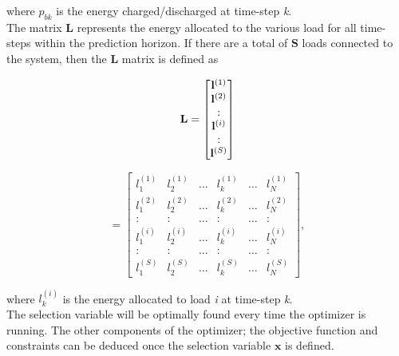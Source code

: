 where $p_{bk}$ is the energy charged/discharged at time-step \textit{k}.\\

The matrix $\mathbf{L}$ represents the energy allocated to the various load for all time-steps within the prediction horizon. If there are a total of $\mathbf{S}$ loads connected to the system, then the $\mathbf{L}$ matrix is defined as

\begin{equation}
    \mathbf{L} = \begin{bmatrix}
                        \mathbf{l}^{(1)} \\
                        \mathbf{l}^{(2)} \\
                        : \\
                        \mathbf{l}^{(i)} \\
                        : \\
                        \mathbf{l}^{(S)}
                    \end{bmatrix}\notag
\end{equation}

\begin{equation}
                = \begin{bmatrix}
                        l_1^{(1)} & l_2^{(1)} & \ldots & l_k^{(1)} & \ldots & l_N^{(1)} \\
                        l_1^{(2)} & l_2^{(2)} & \ldots & l_k^{(2)} & \ldots & l_N^{(2)} \\
                        : & : & \ldots & : & \ldots & : \\
                        l_1^{(i)} & l_2^{(i)} & \ldots & l_k^{(i)} & \ldots & l_N^{(i)} \\
                        : & : & \ldots & : & \ldots & : \\
                        l_1^{(S)} & l_2^{(S)} & \ldots & l_k^{(S)} & \ldots & l_N^{(S)}
                    \end{bmatrix}                     ,
\end{equation}

where $l_k^{(i)}$ is the energy allocated to load \textit{i} at time-step \textit{k}.\\

The selection variable will be optimally found every time the optimizer is running. The other components of the optimizer; the objective function and constraints can be deduced once the selection variable $\mathbf{x}$ is defined. 

